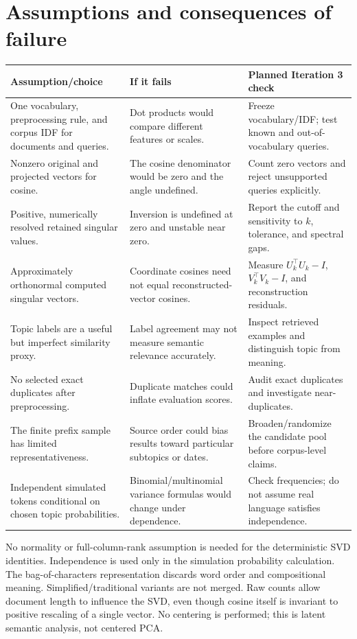 \documentclass[11pt]{article}
\begin{document}
\section{Assumptions and consequences of failure}
\begin{longtable}{p{}p{}p{}}
\toprule Assumption/choice & If it fails & Planned Iteration 3 check \\ \midrule\endhead
One vocabulary, preprocessing rule, and corpus IDF for documents and queries.
& Dot products would compare different features or scales.
& Freeze vocabulary/IDF; test known and out-of-vocabulary queries. \\
Nonzero original and projected vectors for cosine.
& The cosine denominator would be zero and the angle undefined.
& Count zero vectors and reject unsupported queries explicitly. \\
Positive, numerically resolved retained singular values.
& Inversion is undefined at zero and unstable near zero.
& Report the cutoff and sensitivity to $k$, tolerance, and spectral gaps. \\
Approximately orthonormal computed singular vectors.
& Coordinate cosines need not equal reconstructed-vector cosines.
& Measure $U_k^\top U_k-I$, $V_k^\top V_k-I$, and reconstruction residuals. \\
Topic labels are a useful but imperfect similarity proxy.
& Label agreement may not measure semantic relevance accurately.
& Inspect retrieved examples and distinguish topic from meaning. \\
No selected exact duplicates after preprocessing.
& Duplicate matches could inflate evaluation scores.
& Audit exact duplicates and investigate near-duplicates. \\
The finite prefix sample has limited representativeness.
& Source order could bias results toward particular subtopics or dates.
& Broaden/randomize the candidate pool before corpus-level claims. \\
Independent simulated tokens conditional on chosen topic probabilities.
& Binomial/multinomial variance formulas would change under dependence.
& Check frequencies; do not assume real language satisfies independence. \\
\bottomrule
\end{longtable}
No normality or full-column-rank assumption is needed for the deterministic SVD
identities. Independence is used only in the simulation probability calculation.
The bag-of-characters representation discards word order and compositional meaning.
Simplified/traditional variants are not merged. Raw counts allow document length
to influence the SVD, even though cosine itself is invariant to positive rescaling
of a single vector. No centering is performed; this is latent semantic analysis,
not centered PCA.
\end{document}
